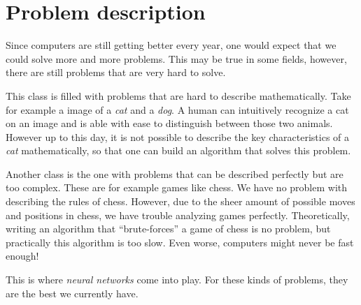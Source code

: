 \section{Problem description}
\label{sec:problem-description}

Since computers are still getting better every year, one would expect that we could solve more and more problems.
This may be true in some fields, however, there are still problems that are very hard to solve.

This class is filled with problems that are hard to describe mathematically.
Take for example a image of a \emph{cat} and a \emph{dog}.
A human can intuitively recognize a cat on an image and is able with ease to distinguish between those two animals.
However up to this day, it is not possible to describe the key characteristics of a \emph{cat} mathematically,
so that one can build an algorithm that solves this problem.

Another class is the one with problems that can be described perfectly but are too complex.
These are for example games like chess.
We have no problem with describing the rules of chess.
However, due to the sheer amount of possible moves and positions in chess, we have trouble analyzing games perfectly.
Theoretically, writing an algorithm that \enquote{brute-forces} a game of chess is no problem, but practically this algorithm is too slow.
Even worse, computers might never be fast enough!

This is where \emph{neural networks} come into play.
For these kinds of problems, they are the best we currently have.
